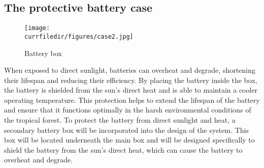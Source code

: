 \newpage
\subsection{The protective battery case}

\begin{figure}[!h]
    \centering
    \texttt{[image: \\currfiledir/figures/case2.jpg]}
    \caption{Battery box}
\end{figure}

When exposed to direct sunlight, batteries can overheat and degrade, shortening their lifespan and reducing their efficiency. By placing the battery inside the box, the battery is shielded from the sun's direct heat and is able to maintain a cooler operating temperature.
This protection helps to extend the lifespan of the battery and ensure that it functions optimally in the harsh environmental conditions of the tropical forest.
To protect the battery from direct sunlight and heat, a secondary battery box will be incorporated into the design of the system. This box will be located underneath the main box and will be designed specifically to shield the battery from the sun's direct heat, which can cause the battery to overheat and degrade.

